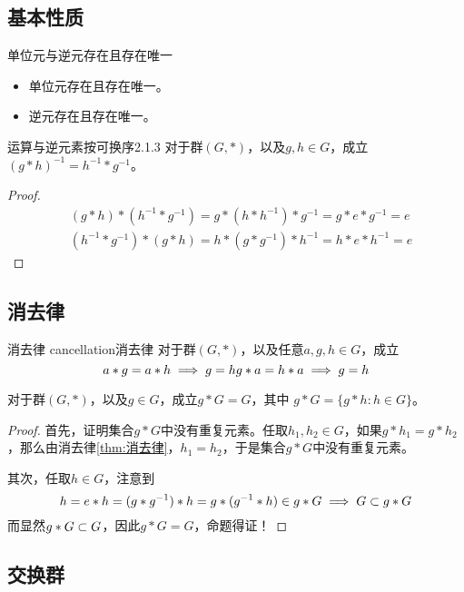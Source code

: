 \subsection{基本性质}

\begin{proposition}{单位元与逆元存在且存在唯一}
	\begin{itemize}
		\item 单位元存在且存在唯一。
		\item 逆元存在且存在唯一。
	\end{itemize}
\end{proposition}

\begin{proposition}{运算与逆元素按可换序}{2.1.3}
	对于群$(G,*)$，以及$g,h\in G$，成立$(g*h)^{-1}=h^{-1}*g^{-1}$。
\end{proposition}

\begin{proof}
	\begin{align*}
		&(g*h)*(h^{-1}*g^{-1})=g*(h*h^{-1})*g^{-1}=g*e*g^{-1}=e\\
		&(h^{-1}*g^{-1})*(g*h)=h*(g*g^{-1})*h^{-1}=h*e*h^{-1}=e
	\end{align*}
\end{proof}

\subsection{消去律}

\begin{theorem}{消去律 cancellation}{消去律}
	对于群$(G,*)$，以及任意$a,g,h\in G$，成立
	$$
	a*g=a*h\implies g=h\\
	g*a=h*a\implies g=h
	$$
\end{theorem}

\begin{proposition}
	对于群$(G,*)$，以及$g\in G$，成立$g*G=G$，其中
	$g*G=\{ g*h:h\in G \}$。
\end{proposition}

\begin{proof}
	首先，证明集合$g*G$中没有重复元素。任取$h_1,h_2\in G$，如果$g*h_1=g*h_2$，那么由消去律\ref{thm:消去律}，$h_1=h_2$，于是集合$g*G$中没有重复元素。
	
	其次，任取$h\in G$，注意到
	$$
	h=e*h=(g*g^{-1})*h=g*(g^{-1}*h)\in g*G\implies G\subset g*G
	$$
	而显然$g*G\subset G$，因此$g*G=G$，命题得证！
\end{proof}

\subsection{交换群}

